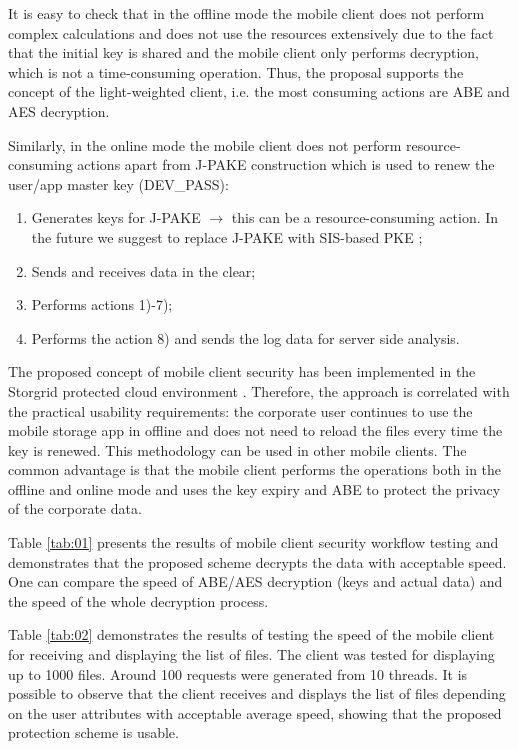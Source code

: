 \documentclass[twocolumn]{svjour3}          	%
\begin{document}
It is easy to check that in the offline mode the mobile client does not perform complex calculations and does not use the resources extensively due to the fact that the initial key is shared and the mobile client only performs decryption, which is not a time-consuming operation. Thus, the proposal supports the concept of the light-weighted client, i.e. the most consuming actions are ABE and AES decryption. 

Similarly, in the online mode the mobile client does not perform resource-consuming actions apart from J-PAKE construction which is used to renew the user/app master key (DEV\_PASS):

\begin{enumerate}
	\item Generates keys for J-PAKE $\rightarrow$ this can be a resource-consuming action. In the future we suggest to replace J-PAKE with SIS-based PKE \cite{bogos2013primeless,bellovin1992encrypted};
	\item Sends and receives data in the clear;
	\item Performs actions 1)-7);
	\item Performs the action 8) and sends the log data for server side analysis.
\end{enumerate}

The proposed concept of mobile client security has been implemented in the Storgrid protected cloud environment \cite{storgrid2016}. Therefore, the approach is correlated with the practical usability requirements: the corporate user continues to use the mobile storage app in offline and does not need to reload the files every time the key is renewed. This methodology can be used in other mobile clients. The common advantage is that the mobile client performs the operations both in the offline and online mode and uses the key expiry and ABE to protect the privacy of the corporate data. 

Table \ref{tab:01} presents the results of mobile client security workflow testing and demonstrates that the proposed scheme decrypts the data with acceptable speed. One can compare the speed of ABE/AES decryption (keys and actual data) and the speed of the whole decryption process.

Table \ref{tab:02} demonstrates the results of testing the speed of the mobile client for receiving and displaying the list of files. The client was tested for displaying up to 1000 files. Around 100 requests were generated from 10 threads. It is possible to observe that the client receives and displays the list of files depending on the user attributes with acceptable average speed, showing that the proposed protection scheme is usable. 
\end{document}
